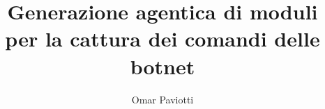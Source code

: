 \documentclass[target=bach,aauheader=,style=]{thud}
\title{Generazione agentica di moduli \\ per la cattura dei comandi delle botnet}
\author{Omar Paviotti}
\begin{document}
\maketitle


\acknowledgements



\tableofcontents

\listoftables

\listoffigures

\mainmatter



















\appendix
\end{document}
